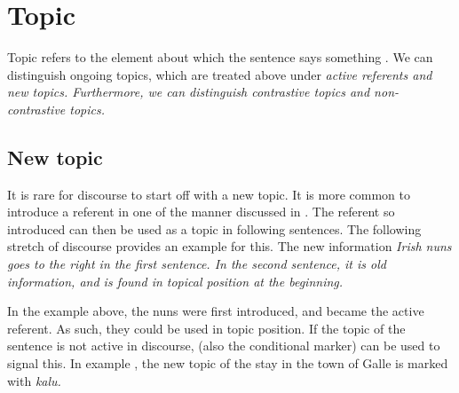 \section{Topic}\label{sec:disc:Topic}
Topic refers to the element about which the sentence says something \citep[118]{Lambrecht1994}. We can distinguish ongoing topics, which are treated above under \em active referents \em {} and new topics. Furthermore, we can distinguish contrastive topics and non-contrastive topics.

\subsection{New topic}\label{sec:disc:Newtopic}
It is rare for discourse to start off with a new topic. It is more common to introduce a referent in one of the manner discussed in . The referent so introduced can then be used as a topic in following sentences. The following stretch of discourse provides an example for this. The new information \em Irish nuns \em goes to the right in the first sentence. In the second sentence, it is old information, and is found in topical position at the beginning.



In the example above, the nuns were first introduced, and became the active referent. As such, they could be used in topic position. If the topic of the sentence is not active in discourse,  (also the conditional marker) can be used to signal this. In example , the new topic of the stay in the town of Galle is marked with \em kalu.\em



